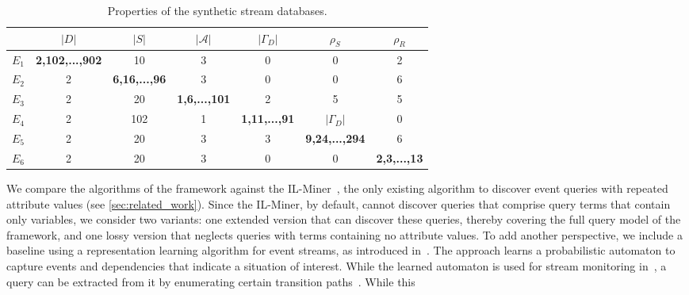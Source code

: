 \begin{table}[t]
	\scriptsize
	\caption{Properties of the synthetic stream databases.}
	\label{tab:synt-scenarios}
	\vspace{-1.2em}
	\begin{tabular}{lcccccc}
		\toprule
		                                          & $|D|$    &
		$|S|$      & $|\mathcal{A}|$ &    $|\Gamma_D|$        &
		$\rho_S$        &   $\rho_R$         \\
		\midrule
		$E_1$                           & \textbf{2,102,...,902} &
		10         & 3          & 0          & 0          & 2          \\
		$E_2$                               & 2          &
		\textbf{6,16,...,96} & 3          & 0          & 0          &
		6          \\
		$E_3$              & 2          & 20         &
		\textbf{1,6,...,101} & 2          & 5          & 5          \\
		$E_4$ & 2          & 102        & 1          &
		\textbf{1,11,...,91} &     $|\Gamma_D|$     & 0          \\
		$E_5$ & 2          & 20         & 3          & 3          &
		\textbf{9,24,...,294} & 6       \\
		$E_6$  & 2          & 20         & 3          & 0          &
		0          & \textbf{2,3,...,13} \\
		\bottomrule
	\end{tabular}
	\vspace{-1.4em}
\end{table}
We compare the algorithms of the \sys{} framework against the
IL-Miner~\cite{ilminer}, the only existing algorithm to discover event
queries with repeated attribute values (see \autoref{sec:related_work}).
Since the IL-Miner, by default, cannot discover queries that comprise query
terms that contain only variables, we consider two variants: one extended
version that can discover these queries, thereby covering the full query
model of the \sys{} framework, and one lossy version that neglects queries
with terms containing no attribute values.
To add another perspective, we include a baseline using a representation
learning algorithm for event streams, as introduced in~\cite{yanli2021}. The
approach learns a probabilistic
automaton to capture events and dependencies that indicate a situation of
interest. While the learned automaton is used for stream monitoring
in~\cite{yanli2021}, a query can be extracted from it by enumerating certain
transition paths~\cite{makowsky2012}. While this
